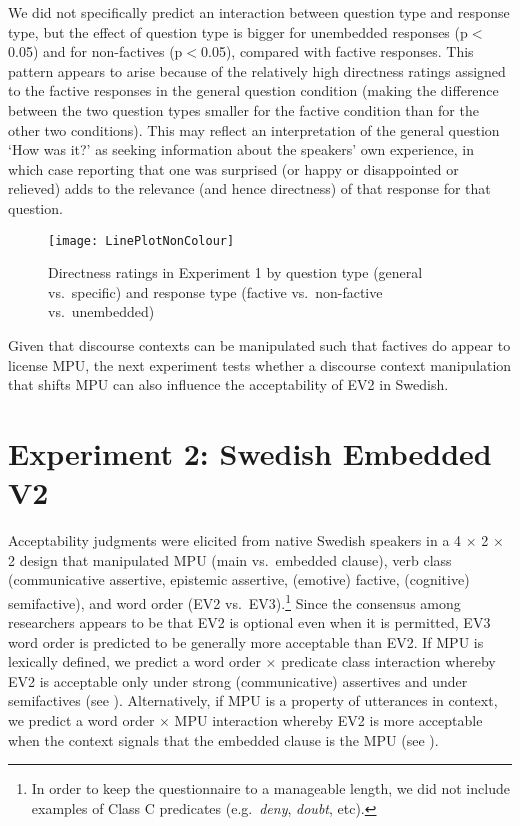 \documentclass[output=paper]{LSP/langsci}
\begin{document}
We did not specifically predict an interaction between question type and response type, but the effect of question type is bigger for unembedded responses (p$<$0.05) and for non-factives (p$<$0.05), compared with factive responses.  This pattern appears to arise because of the relatively high directness ratings assigned to the factive responses in the general question condition (making the difference between the two question types smaller for the factive condition than for the other two conditions).  This may reflect an interpretation of the general question `How was it?' as seeking information about the speakers' own experience, in which case reporting that one was surprised (or happy or disappointed or relieved) adds to the relevance (and hence directness) of that response for that question. 

\begin{figure}[H]
\centering
\texttt{[image: LinePlotNonColour]}
\caption{{Directness ratings in Experiment 1 by question type (general vs.\ specific) and response type (factive vs.\ non-factive vs.\ unembedded)}}
\label{fig:ev2:englishStudy}
\end{figure} 

Given that discourse contexts can be manipulated such that factives do appear to license MPU, the next experiment tests whether a discourse context manipulation that shifts MPU can also influence the acceptability of EV2 in Swedish.


\section{Experiment 2: Swedish Embedded V2}

Acceptability judgments were elicited from native Swedish speakers in a 4 $\times$ 2 $\times$ 2 design that manipulated MPU (main vs.\ embedded clause), verb class (communicative assertive, epistemic assertive, (emotive) factive, (cognitive) semifactive),  and word order (EV2 vs.\ EV3).\footnote{In order to keep the questionnaire to a manageable length, we did not include examples of Class C predicates (e.g.\ \textit{deny}, \textit{doubt}, etc).}
 Since the consensus among researchers appears to be that EV2 is optional even when it is permitted, EV3 word order is predicted to be generally more acceptable than EV2.  If MPU is lexically defined, we predict a word order $\times$ predicate class interaction whereby EV2 is acceptable only under strong (communicative) assertives and under semifactives (see \cite{wiklund-etal09}).  Alternatively, if MPU is a property of utterances in context, we predict a word order $\times$ MPU interaction whereby EV2 is more acceptable when the context signals that the embedded clause is the MPU (see \cite{jensen-christensen13}).
\end{document}
